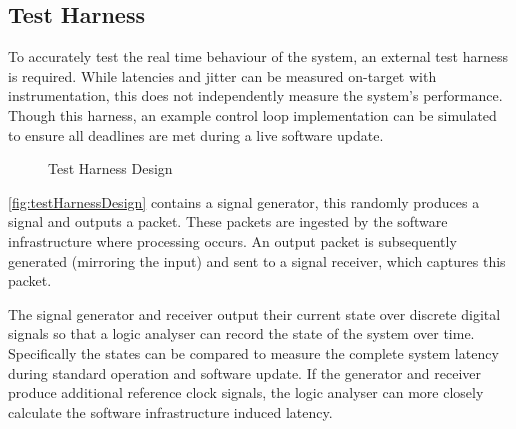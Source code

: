 \newpage

\graphicspath{{main/hardware/graphics/}}

\subsection{Test Harness}


To accurately test the real time behaviour of the system, an external test harness is required. While latencies and jitter can be measured on-target with instrumentation, this does not independently measure the system's performance. Though this harness, an example control loop implementation can be simulated to ensure all deadlines are met during a live software update.

\begin{figure}[ht]
    \centering
    \caption[Test Harness Design]
    {Test Harness Design}
    \label{fig:testHarnessDesign}
\end{figure}

\autoref{fig:testHarnessDesign} contains a signal generator, this randomly produces a signal and outputs a packet. These packets are ingested by the software infrastructure where processing occurs. An output packet is subsequently generated (mirroring the input) and sent to a signal receiver, which captures this packet.

The signal generator and receiver output their current state over discrete digital signals so that a logic analyser can record the state of the system over time. Specifically the states can be compared to measure the complete system latency during standard operation and software update. If the generator and receiver produce additional reference clock signals, the logic analyser can more closely calculate the software infrastructure induced latency.

